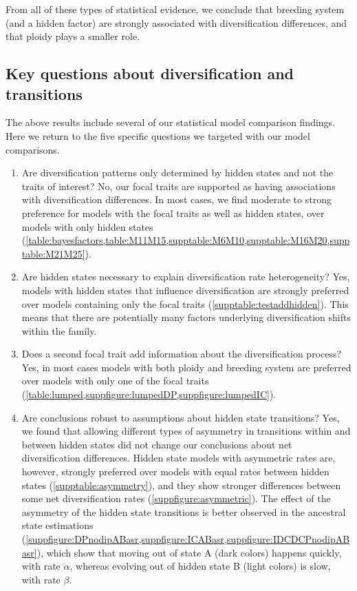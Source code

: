 From all of these types of statistical evidence, we conclude that breeding system (and a hidden factor) are strongly associated with diversification differences, and that ploidy plays a smaller role.


\subsection{Key questions about diversification and transitions}

The above results include several of our statistical model comparison findings.
Here we return to the five specific questions we targeted with our model comparisons.

\begin{enumerate}

    \item Are diversification patterns only determined by hidden states and not the traits of interest?
    No, our focal traits are supported as having associations with diversification differences.
    In most cases, we find moderate to strong preference for models with the focal traits as well as hidden states, over models with only hidden states (\cref{table:bayesfactors,table:M11M15,supptable:M6M10,supptable:M16M20,supptable:M21M25}). %

    \item Are hidden states necessary to explain diversification rate heterogeneity?
    Yes, models with hidden states that influence diversification are strongly preferred over models containing only the focal traits (\cref{supptable:testaddhidden}).
    This means that there are potentially many factors underlying diversification shifts within the family. %

    \item Does a second focal trait add information about the diversification process?
    Yes, in most cases models with both ploidy and breeding system are preferred over models with only one of the focal traits (\cref{table:lumped,suppfigure:lumpedDP,suppfigure:lumpedIC}).

    \item Are conclusions robust to assumptions about hidden state transitions?
    Yes, we found that allowing different types of asymmetry in transitions within and between hidden states did not change our conclusions about net diversification differences.
    Hidden state models with asymmetric rates are, however, strongly preferred over models with equal rates between hidden states (\cref{supptable:asymmetry}), and they show stronger differences between some net diversification rates (\cref{suppfigure:asymmetric}).
   The effect of the asymmetry of the hidden state transitions is better observed in the ancestral state estimations (\cref{suppfigure:DPnodipABasr,suppfigure:ICABasr,suppfigure:IDCDCPnodipABasr}), which show that moving out of state A (dark colors) happens quickly, with rate $\alpha$,  whereas evolving out of hidden state B (light colors) is slow, with rate $\beta$. 
        

\end{enumerate}
